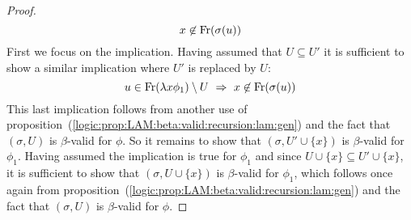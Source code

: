 \begin{proof}
\[        x\not\in\mbox{\rm Fr}(\sigma(u))
    \]
    First we focus on the implication. Having assumed that $U\subseteq U'$
    it is sufficient to show a similar implication where $U'$ is replaced by $U$:
    \[
        u\in\free(\lambda x\phi_{1})\setminus U
        \ \Rightarrow\ 
        x\not\in\free(\sigma(u))
    \]
    This last implication follows from another use of
    proposition~(\ref{logic:prop:LAM:beta:valid:recursion:lam:gen}) and the
    fact that $(\sigma,U)$ is $\beta$-valid for $\phi$. So it remains to 
    show that $(\sigma,U'\cup\{x\})$ is $\beta$-valid for $\phi_{1}$.
    Having assumed the implication is true for $\phi_{1}$ and since 
    $U\cup\{x\}\subseteq U'\cup\{x\}$, it is sufficient to show that 
    $(\sigma, U\cup\{x\})$ is $\beta$-valid for $\phi_{1}$, which 
    follows once again from
    proposition~(\ref{logic:prop:LAM:beta:valid:recursion:lam:gen}) and the
    fact that $(\sigma,U)$ is $\beta$-valid for $\phi$.
\end{proof}

